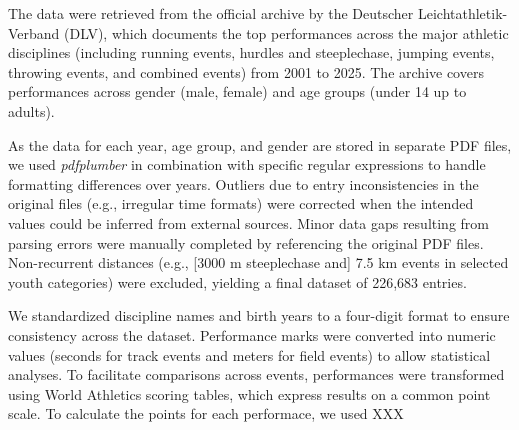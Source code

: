The data were retrieved from the official archive by the Deutscher Leichtathletik-Verband (DLV), which documents the top performances across the major athletic disciplines (including running 
events, hurdles and steeplechase, jumping events, throwing events, and combined events) from 2001 to 2025. The archive covers performances across gender (male, female) and age groups (under 14 up to adults). 

As the data for each year, age group, and gender are stored in separate PDF files, we used \textit{pdfplumber} in combination with specific regular expressions to handle formatting differences 
over years. Outliers due to entry inconsistencies in the original files (e.g., irregular time formats) were corrected when the intended values could be inferred from external sources. Minor data 
gaps resulting from parsing errors were manually completed by referencing the original PDF files. Non-recurrent distances (e.g., [3000 m steeplechase and] 7.5 km events in selected youth categories) 
were excluded, yielding a final dataset of 226,683 entries.

We standardized discipline names and birth years to a four-digit format to ensure consistency across the dataset. Performance marks were converted into numeric values (seconds for track events and 
meters for field events) to allow statistical analyses. To facilitate comparisons across events, performances were transformed using World Athletics scoring tables, which express results on a common 
point scale. To calculate the points for each performace, we used XXX